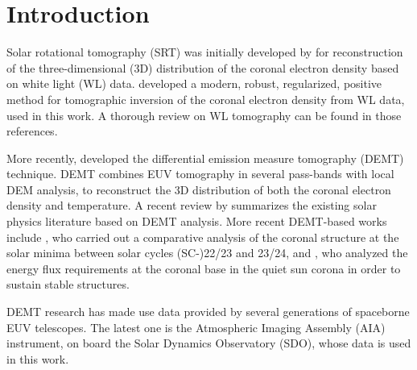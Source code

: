 \documentclass[baaa]{baaa}
\begin{document}

\maketitle

\section{Introduction}\label{intro}

Solar rotational tomography (SRT) was initially developed by \citet{altschuler_1972} for reconstruction of the three-dimensional (3D) distribution of the coronal electron density based on white light (WL) data. \citet{frazin_2002} developed a modern, robust, regularized, positive method for tomographic inversion of the coronal electron density from WL data, used in this work. A thorough review on WL tomography can be found in those references.

More recently, \citet{frazin_2009} developed the differential emission measure tomography (DEMT) technique. DEMT combines EUV tomography in several pass-bands with local DEM analysis, to reconstruct the 3D distribution of both the coronal electron density and temperature. A recent review by \citet{vasquez_2016} summarizes the existing solar physics literature based on DEMT analysis. More recent DEMT-based works include \citet{lloveras_2017}, who carried out a comparative analysis of the coronal structure at the solar minima between solar cycles (SC-)22/23 and 23/24, and \citet{maccormack_2017}, who analyzed the energy flux requirements at the coronal base in the quiet sun corona in order to sustain stable structures. 

DEMT research has made use  data provided by several generations of spaceborne EUV telescopes. The latest one is the Atmospheric Imaging Assembly (AIA) instrument, on board the Solar Dynamics Observatory (SDO), whose data is used in this work.
\end{document}
